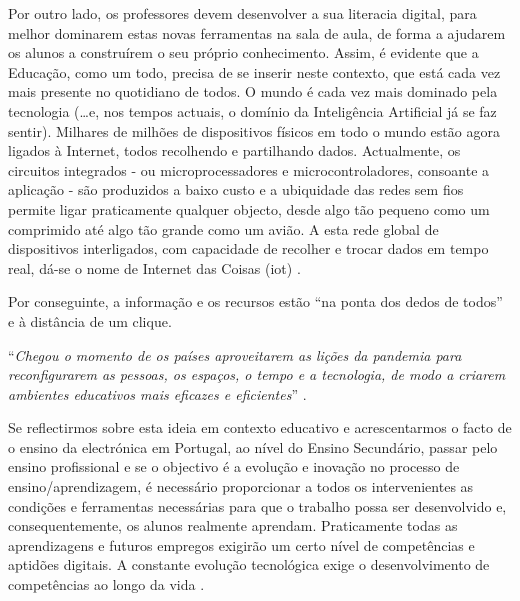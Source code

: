 Por outro lado, os professores devem desenvolver a sua literacia digital, para melhor dominarem estas novas ferramentas na sala de aula, de forma a ajudarem os alunos a construírem o seu próprio conhecimento. Assim, é evidente que a Educação, como um todo, precisa de se inserir neste contexto, que está cada vez mais presente no quotidiano de todos. O mundo é cada vez mais dominado pela tecnologia (\ldots e, nos tempos actuais, o domínio da Inteligência Artificial já se faz sentir). Milhares de milhões de dispositivos físicos em todo o mundo estão agora ligados à Internet, todos recolhendo e partilhando dados. Actualmente, os circuitos integrados - ou microprocessadores e microcontroladores, consoante a aplicação - são produzidos a baixo custo e a ubiquidade das redes sem fios permite ligar praticamente qualquer objecto, desde algo tão pequeno como um comprimido até algo tão grande como um avião. A esta rede global de dispositivos interligados, com capacidade de recolher e trocar dados em tempo real, dá-se o nome de Internet das Coisas (\acrfull{iot}) \cite{IoT}.

Por conseguinte, a informação e os recursos estão “na ponta dos dedos de todos” e à distância de um clique.

\begin{center}
    ``\textit{Chegou o momento de os países aproveitarem as lições da pandemia para reconfigurarem as pessoas, os espaços, o tempo e a tecnologia, de modo a criarem ambientes educativos mais eficazes e eficientes}'' \cite{thestateofeducation}.
\end{center}

Se reflectirmos sobre esta ideia em contexto educativo e acrescentarmos o facto de o ensino da electrónica em Portugal, ao nível do Ensino Secundário, passar pelo ensino profissional e se o objectivo é a evolução e inovação no processo de ensino/aprendizagem, é necessário proporcionar a todos os intervenientes as condições e ferramentas necessárias para que o trabalho possa ser desenvolvido e, consequentemente, os alunos realmente aprendam. Praticamente todas as aprendizagens e futuros empregos exigirão um certo nível de competências e aptidões digitais. A constante evolução tecnológica exige o desenvolvimento de competências ao longo da vida \cite{Digitale13:online}.

